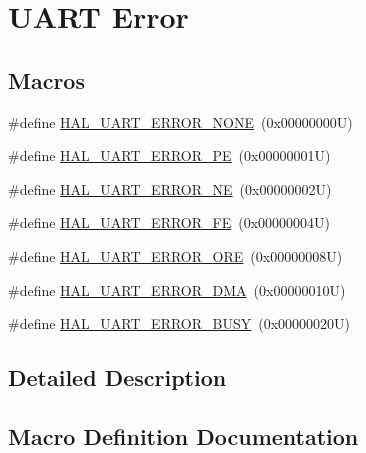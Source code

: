 \hypertarget{group___u_a_r_t___error}{}\section{U\+A\+RT Error}
\label{group___u_a_r_t___error}
\subsection*{Macros}
\begin{DoxyCompactItemize}
\item 
\#define \hyperlink{group___u_a_r_t___error_ga275de35cb518c19c284764f3ecb1aac5}{H\+A\+L\+\_\+\+U\+A\+R\+T\+\_\+\+E\+R\+R\+O\+R\+\_\+\+N\+O\+NE}~(0x00000000\+U)
\item 
\#define \hyperlink{group___u_a_r_t___error_gad447a37701acd199dcb653ce32917970}{H\+A\+L\+\_\+\+U\+A\+R\+T\+\_\+\+E\+R\+R\+O\+R\+\_\+\+PE}~(0x00000001\+U)
\item 
\#define \hyperlink{group___u_a_r_t___error_ga4a4e32a346dd01f4c41c4fc27afbc72c}{H\+A\+L\+\_\+\+U\+A\+R\+T\+\_\+\+E\+R\+R\+O\+R\+\_\+\+NE}~(0x00000002\+U)
\item 
\#define \hyperlink{group___u_a_r_t___error_gaf23cb510d4dc2c8e05a45abfbf5f3457}{H\+A\+L\+\_\+\+U\+A\+R\+T\+\_\+\+E\+R\+R\+O\+R\+\_\+\+FE}~(0x00000004\+U)
\item 
\#define \hyperlink{group___u_a_r_t___error_gaedc030add6c499cf41be7f12dd95930c}{H\+A\+L\+\_\+\+U\+A\+R\+T\+\_\+\+E\+R\+R\+O\+R\+\_\+\+O\+RE}~(0x00000008\+U)
\item 
\#define \hyperlink{group___u_a_r_t___error_gac1d608ae3499a449cd6cd102e7f86605}{H\+A\+L\+\_\+\+U\+A\+R\+T\+\_\+\+E\+R\+R\+O\+R\+\_\+\+D\+MA}~(0x00000010\+U)
\item 
\#define \hyperlink{group___u_a_r_t___error_ga46f7e1bedf02c80a1347037e4e7f7d4d}{H\+A\+L\+\_\+\+U\+A\+R\+T\+\_\+\+E\+R\+R\+O\+R\+\_\+\+B\+U\+SY}~(0x00000020\+U)
\end{DoxyCompactItemize}


\subsection{Detailed Description}


\subsection{Macro Definition Documentation}
\mbox{\label{group___u_a_r_t___error_ga46f7e1bedf02c80a1347037e4e7f7d4d}} 
